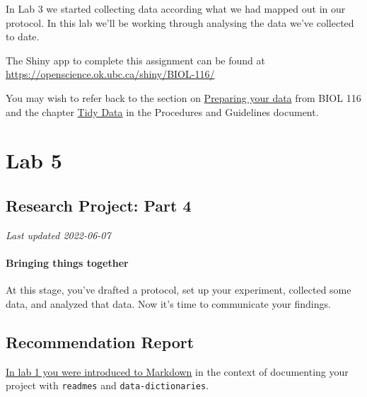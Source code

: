 \documentclass[
]{book}
\begin{document}
In Lab 3 we started collecting data according what we had mapped out in our protocol. In this lab we'll be working through analysing the data we've collected to date.

The Shiny app to complete this assignment can be found at \url{https://openscience.ok.ubc.ca/shiny/BIOL-116/}

You may wish to refer back to the section on \href{https://ubco-biology.github.io/BIOL-116-Lab-Manual/preparing-your-data.html}{Preparing your data} from BIOL 116 and the chapter \href{https://ubco-biology.github.io/Procedures-and-Guidelines/tidy-data.html}{Tidy Data} in the Procedures and Guidelines document.

\hypertarget{part-lab-5}{%
\part*{Lab 5}\label{part-lab-5}}

\hypertarget{research-project-part-4}{%
\chapter*{Research Project: Part 4}\label{research-project-part-4}}

\emph{Last updated 2022-06-07}

\hypertarget{bringing-things-together}{%
\subsection*{Bringing things together}\label{bringing-things-together}}

At this stage, you've drafted a protocol, set up your experiment, collected some data, and analyzed that data. Now it's time to communicate your findings.

\hypertarget{recommendation-report}{%
\chapter*{Recommendation Report}\label{recommendation-report}}

\href{https://ubco-biology.github.io/Procedures-and-Guidelines/readme-files-and-data-dictionaries.html\#markdown}{In lab 1 you were introduced to Markdown} in the context of documenting your project with \texttt{readmes} and \texttt{data-dictionaries}.
\end{document}
